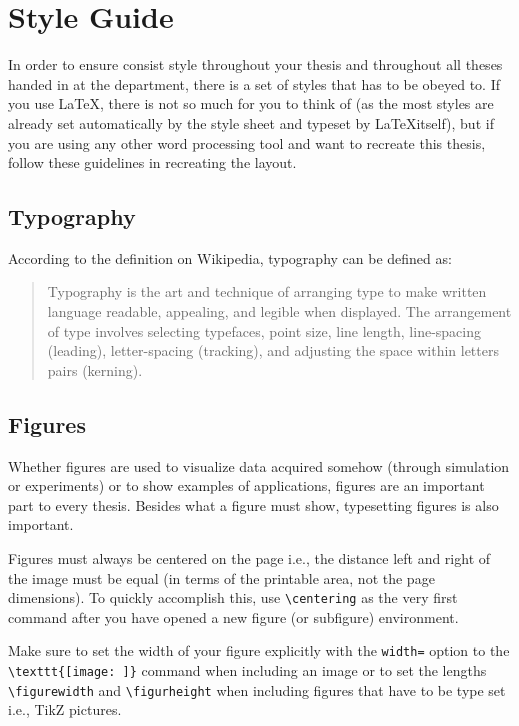 \chapter{Style Guide}\label{cha:style-guide}

\begin{intro}
    In order to ensure consist style throughout your thesis and throughout all theses handed in at the department, there is a set of styles that has to be obeyed to.
    If you use \LaTeX, there is not so much for you to think of (as the most styles are already set automatically by the style sheet and typeset by \LaTeX itself), but if you are using any other word processing tool and want to recreate this thesis, follow these guidelines in recreating the layout.
\end{intro}


\section{Typography}\label{sec:style-guide:typography}

According to the definition on Wikipedia, typography can be defined as:

\begin{quotation}
Typography is the art and technique of arranging type to make written language readable, appealing, and legible when displayed. The arrangement of type involves selecting typefaces, point size, line length, line-spacing (leading), letter-spacing (tracking), and adjusting the space within letters pairs (kerning).
\end{quotation}


\section{Figures}\label{sec:style-guide:figures}

Whether figures are used to visualize data acquired somehow (through simulation or experiments) or to show examples of applications, figures are an important part to every thesis.
Besides what a figure must show, typesetting figures is also important.

Figures must always be centered on the page i.e., the distance left and right of the image must be equal (in terms of the printable area, not the page dimensions).
To quickly accomplish this, use \lstinline!\centering! as the very first command after you have opened a new figure (or subfigure) environment.

Make sure to set the width of your figure explicitly with the \lstinline!width=! option to the \lstinline!\texttt{[image: ]}! command when including an image or to set the lengths \lstinline!\figurewidth! and \lstinline!\figurheight! when including figures that have to be type set i.e., TikZ pictures.

